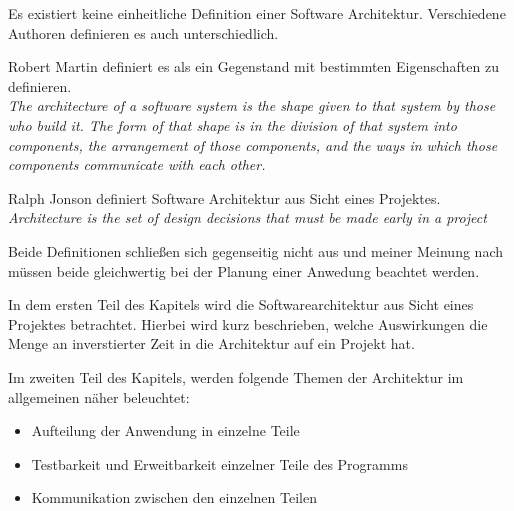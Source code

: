 Es existiert keine einheitliche Definition einer Software Architektur. Verschiedene Authoren definieren es auch unterschiedlich.

Robert Martin definiert es als ein Gegenstand mit bestimmten Eigenschaften zu definieren.\\
\textit{The architecture of a software system is the shape given to that system by those who build it. 
The form of that shape is in the division of that system into components, the arrangement of those components, 
and the ways in which those components communicate with each other.} \cite[136]{cleanArchitecture}

Ralph Jonson definiert Software Architektur aus Sicht eines Projektes.\\
\textit{Architecture is the set of design decisions that must be made early in a project}
\cite{MF_WhatIsSA}

Beide Definitionen schließen sich gegenseitig nicht aus und
meiner Meinung nach müssen beide gleichwertig bei der Planung einer Anwedung beachtet werden.

In dem ersten Teil des Kapitels wird die Softwarearchitektur aus Sicht eines Projektes betrachtet.
Hierbei wird kurz beschrieben, welche Auswirkungen die Menge an inverstierter Zeit in die Architektur auf ein Projekt hat.

Im zweiten Teil des Kapitels, werden folgende Themen der Architektur im allgemeinen näher beleuchtet:
\begin{itemize}
    \item Aufteilung der Anwendung in einzelne Teile
    \item Testbarkeit und Erweitbarkeit einzelner Teile des Programms
    \item Kommunikation zwischen den einzelnen Teilen
\end{itemize}